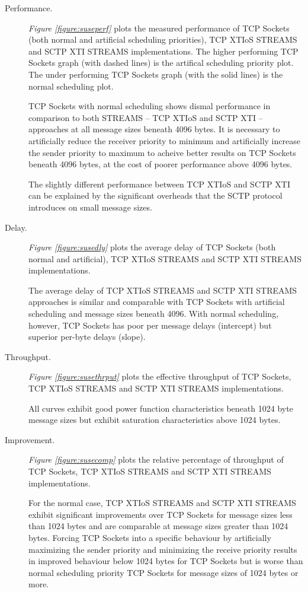 \documentclass[letterpaper,final,notitlepage,twocolumn,10pt,twoside]{article}
\begin{document}
\begin{description}

\item[Performance.]

\textit{Figure \ref{figure:suseperf}}
plots the measured performance of TCP Sockets (both normal and artificial scheduling priorities),
TCP XTIoS STREAMS and SCTP XTI STREAMS implementations.
The higher performing TCP Sockets graph (with dashed lines) is the artifical scheduling priority
plot.  The under performing TCP Sockets graph (with the solid lines) is the normal scheduling plot.

TCP Sockets with normal scheduling shows dismal performance in comparison to both STREAMS -- TCP
XTIoS and SCTP XTI -- approaches at all message sizes beneath 4096 bytes.  It is necessary to
artificially reduce the receiver priority to minimum and artificially increase the sender priority
to maximum to acheive better results on TCP Sockets beneath 4096 bytes, at the cost of poorer
performance above 4096 bytes.

The slightly different performance between TCP XTIoS and SCTP XTI can be explained by the
significant overheads that the SCTP protocol introduces on small message sizes.

\item[Delay.]

\textit{Figure \ref{figure:susedly}}
plots the average delay of TCP Sockets (both normal and artificial), TCP XTIoS STREAMS and SCTP XTI
STREAMS implementations.

The average delay of TCP XTIoS STREAMS and SCTP XTI STREAMS approaches is similar and comparable
with TCP Sockets with artificial scheduling and message sizes beneath 4096.  With normal scheduling,
however, TCP Sockets has poor per message delays (intercept) but superior per-byte delays (slope).

\item[Throughput.]

\textit{Figure \ref{figure:susethrput}}
plots the effective throughput of TCP Sockets, TCP XTIoS STREAMS and SCTP XTI STREAMS
implementations.

All curves exhibit good power function characteristics beneath 1024 byte  message sizes but exhibit
saturation characteristics above 1024 bytes.

\item[Improvement.]

\textit{Figure \ref{figure:susecomp}}
plots the relative percentage of throughput of TCP Sockets, TCP XTIoS STREAMS and SCTP XTI STREAMS
implementations.

For the normal case, TCP XTIoS STREAMS and SCTP XTI STREAMS exhibit significant improvements over
TCP Sockets for message sizes less than 1024 bytes and are comparable  at message sizes greater than
1024 bytes.  Forcing TCP Sockets into a specific behaviour by artificially maximizing the sender
priority and minimizing the receive priority results in improved behaviour below 1024 bytes for TCP
Sockets but is worse than normal scheduling priority TCP Sockets for message sizes of 1024 bytes or
more.

\end{description}
\end{document}
